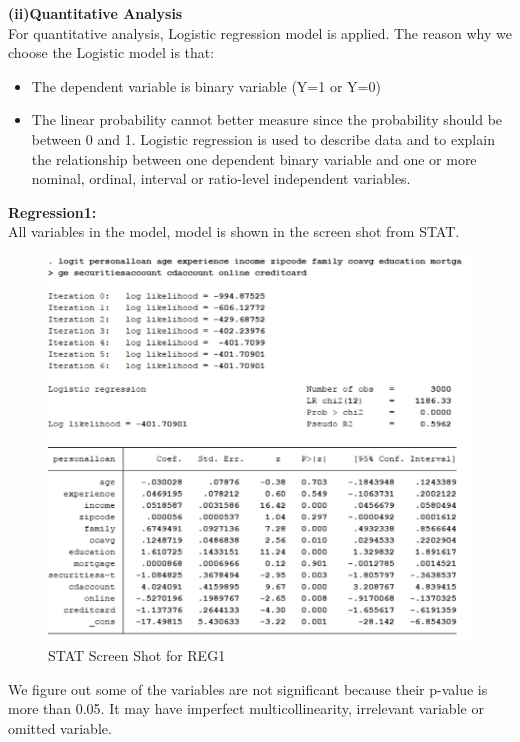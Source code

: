 \documentclass[]{article}
\begin{document}
\textbf{(ii)Quantitative Analysis}\\
For quantitative analysis, Logistic regression model is applied. The reason why we choose the Logistic model is that:
\begin{itemize}
	\item The dependent variable is binary variable (Y=1 or Y=0)
	\item The linear probability cannot better measure since the probability should be between 0 and 1. Logistic regression is used to describe data and to explain the relationship between one dependent binary variable and one or more nominal, ordinal, interval or ratio-level independent variables.\\
\end{itemize}
\textbf{Regression1: }\\
All variables in the model, model is shown in the screen shot from STAT.
\begin{figure}[H]
	\centering
	\includegraphics[width=1\linewidth,height=1\textheight]{tem_files/figure-latex/REG1.pdf}\caption{STAT Screen Shot for REG1}
\end{figure}
We figure out some of the variables are not significant because their p-value is more than 0.05. It may have imperfect multicollinearity, irrelevant variable or omitted variable. \\
\end{document}
